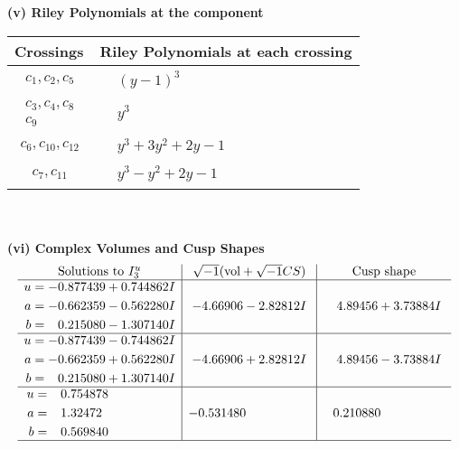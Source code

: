 \documentclass[1p]{elsarticle_modified}
\theoremstyle{definition}
\newcommand{\I}{\sqrt{-1}}
\begin{document}
\newpage\renewcommand{\arraystretch}{1}
\flushleft \textbf{(v) Riley Polynomials at the component}\newline \\
\begin{tabular}{m{50pt}|m{274pt}}
Crossings & \hspace{64pt}Riley Polynomials at each crossing \\
\hline $$\begin{aligned}c_{1},c_{2},c_{5}\end{aligned}$$&$\begin{aligned}
&(y-1)^3
\end{aligned}$\\
\hline $$\begin{aligned}c_{3},c_{4},c_{8}\\c_{9}\end{aligned}$$&$\begin{aligned}
&y^3
\end{aligned}$\\
\hline $$\begin{aligned}c_{6},c_{10},c_{12}\end{aligned}$$&$\begin{aligned}
&y^3+3 y^2+2 y-1
\end{aligned}$\\
\hline $$\begin{aligned}c_{7},c_{11}\end{aligned}$$&$\begin{aligned}
&y^3- y^2+2 y-1
\end{aligned}$\\
\hline
\end{tabular}\\~\\
\newpage\flushleft \textbf{(vi) Complex Volumes and Cusp Shapes}
$$\begin{array}{c|c|c}  
\text{Solutions to }I^u_{3}& \I (\text{vol} + \sqrt{-1}CS) & \text{Cusp shape}\\
 \hline 
\begin{aligned}
u &= -0.877439 + 0.744862 I \\
a &= -0.662359 - 0.562280 I \\
b &= \phantom{-}0.215080 - 1.307140 I\end{aligned}
 & -4.66906 - 2.82812 I & \phantom{-}4.89456 + 3.73884 I \\ \hline\begin{aligned}
u &= -0.877439 - 0.744862 I \\
a &= -0.662359 + 0.562280 I \\
b &= \phantom{-}0.215080 + 1.307140 I\end{aligned}
 & -4.66906 + 2.82812 I & \phantom{-}4.89456 - 3.73884 I \\ \hline\begin{aligned}
u &= \phantom{-}0.754878\phantom{ +0.000000I} \\
a &= \phantom{-}1.32472\phantom{ +0.000000I} \\
b &= \phantom{-}0.569840\phantom{ +0.000000I}\end{aligned}
 & -0.531480\phantom{ +0.000000I} & \phantom{-}0.210880\phantom{ +0.000000I}\\
 \hline 
 \end{array}$$\newpage
\end{document}
